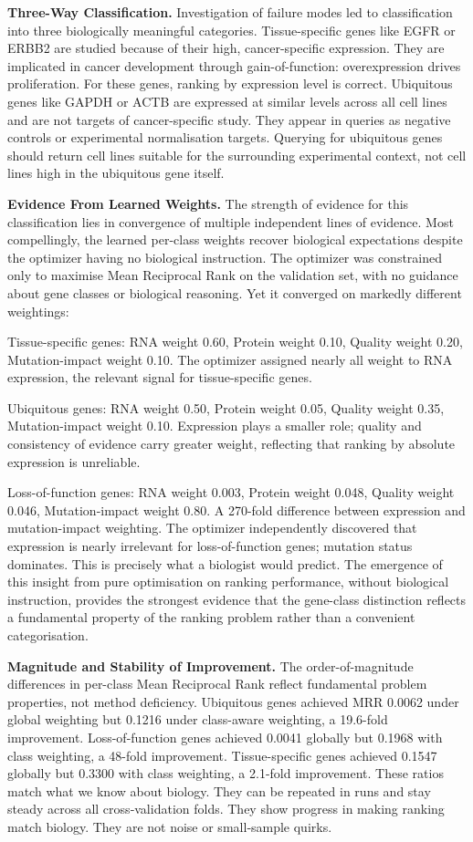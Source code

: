 \documentclass[author={Karen Coutinho, Ishaan Bhalla, Aman Raj, Dixit Kaloorani Malarmannan},
                supervisor={Dr. Daniel D'Andrea},
                degree={MSc},
                title={CellSelector Omics: A Multi-Omics Recommendation System for Cell Line Selection},
                subtitle={},
                type={},
                year={2026}]{dissertation}
\begin{document}
{\bf Three-Way Classification.} Investigation of failure modes led to classification into three biologically meaningful categories. Tissue-specific genes like EGFR or ERBB2 are studied because of their high, cancer-specific expression. They are implicated in cancer development through gain-of-function: overexpression drives proliferation. For these genes, ranking by expression level is correct. Ubiquitous genes like GAPDH or ACTB are expressed at similar levels across all cell lines and are not targets of cancer-specific study. They appear in queries as negative controls or experimental normalisation targets. Querying for ubiquitous genes should return cell lines suitable for the surrounding experimental context, not cell lines high in the ubiquitous gene itself.

{\bf Evidence From Learned Weights.} The strength of evidence for this classification lies in convergence of multiple independent lines of evidence. Most compellingly, the learned per-class weights recover biological expectations despite the optimizer having no biological instruction. The optimizer was constrained only to maximise Mean Reciprocal Rank on the validation set, with no guidance about gene classes or biological reasoning. Yet it converged on markedly different weightings:

Tissue-specific genes: RNA weight 0.60, Protein weight 0.10, Quality weight 0.20, Mutation-impact weight 0.10. The optimizer assigned nearly all weight to RNA expression, the relevant signal for tissue-specific genes.

Ubiquitous genes: RNA weight 0.50, Protein weight 0.05, Quality weight 0.35, Mutation-impact weight 0.10. Expression plays a smaller role; quality and consistency of evidence carry greater weight, reflecting that ranking by absolute expression is unreliable.

Loss-of-function genes: RNA weight 0.003, Protein weight 0.048, Quality weight 0.046, Mutation-impact weight 0.80. A 270-fold difference between expression and mutation-impact weighting. The optimizer independently discovered that expression is nearly irrelevant for loss-of-function genes; mutation status dominates. This is precisely what a biologist would predict. The emergence of this insight from pure optimisation on ranking performance, without biological instruction, provides the strongest evidence that the gene-class distinction reflects a fundamental property of the ranking problem rather than a convenient categorisation.

{\bf Magnitude and Stability of Improvement.} The order-of-magnitude differences in per-class Mean Reciprocal Rank reflect fundamental problem properties, not method deficiency. Ubiquitous genes achieved MRR 0.0062 under global weighting but 0.1216 under class-aware weighting, a 19.6-fold improvement. Loss-of-function genes achieved 0.0041 globally but 0.1968 with class weighting, a 48-fold improvement. Tissue-specific genes achieved 0.1547 globally but 0.3300 with class weighting, a 2.1-fold improvement. These ratios match what we know about biology. They can be repeated in runs and stay steady across all cross‑validation folds. They show progress in making ranking match biology. They are not noise or small‑sample quirks.
\end{document}
